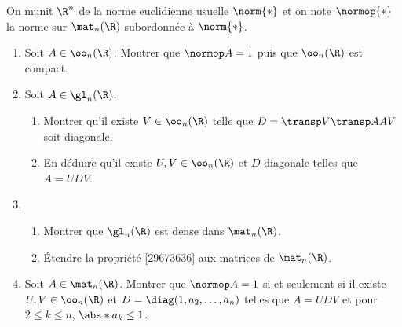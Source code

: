 \begin{enonce}
\begin{exercise}[ID={RMS 122-2 E853},subtitle={},tags={}, difficulty={0}]
  On munit $\R^n$ de la norme euclidienne usuelle $\norm{*}$ et on note $\normop{*}$ la norme sur $\mat_n(\R)$ subordonnée à $\norm{*}$.
\begin{enumerate}
  \item Soit $A\in\oo_n(\R)$. Montrer que $\normop A=1$ puis que $\oo_n(\R)$ est compact.
  \item Soit $A\in\gl_n(\R)$.
    \begin{enumerate}
      \item 
Montrer qu'il existe $V\in\oo_n(\R)$ telle que $D=\transp V\transp A AV$ soit diagonale.
      \item \label{29673636}
        En déduire qu'il existe $U,V\in\oo_n(\R)$ et $D$ diagonale telles que $A=UDV$.
    \end{enumerate}
  \item
    \begin{enumerate}
      \item Montrer que $\gl_n(\R)$ est dense dans $\mat_n(\R)$.
      \item Étendre la propriété \ref{29673636} aux matrices de $\mat_n(\R)$.
    \end{enumerate}
  \item Soit $A\in\mat_n(\R)$.
    Montrer que $\normop A=1$ si et seulement si il existe $U,V\in\oo_n(\R)$ et $D=\diag(1,a_2,\dotsc,a_n)$ telles que $A=UDV$ et pour $2\leq k\leq n$, $\abs*{a_k}\leq1$.
\end{enumerate}
\end{exercise}
\begin{solution}
\end{solution}
\end{enonce}
